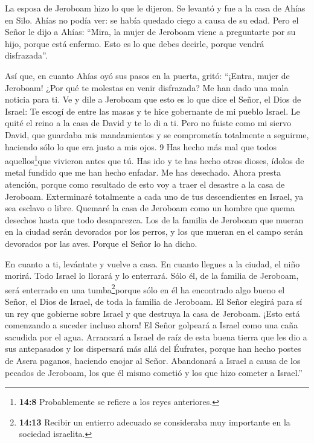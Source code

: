  La esposa de Jeroboam hizo lo que le dijeron. Se levantó y
fue a la casa de Ahías en Silo. Ahías no podía ver: se había quedado
ciego a causa de su edad.  Pero el Señor le dijo a Ahías:
``Mira, la mujer de Jeroboam viene a preguntarte por su hijo, porque
está enfermo. Esto es lo que debes decirle, porque vendrá disfrazada''.

 Así que, en cuanto Ahías oyó sus pasos en la puerta, gritó:
``¡Entra, mujer de Jeroboam! ¿Por qué te molestas en venir disfrazada?
Me han dado una mala noticia para ti.  Ve y dile a Jeroboam
que esto es lo que dice el Señor, el Dios de Israel: Te escogí de entre
las masas y te hice gobernante de mi pueblo Israel.  Le
quité el reino a la casa de David y te lo di a ti. Pero no fuiste como
mi siervo David, que guardaba mis mandamientos y se comprometía
totalmente a seguirme, haciendo sólo lo que era justo a mis ojos. 9 Has
hecho más mal que todos aquellos\footnote{\textbf{14:8} Probablemente se
  refiere a los reyes anteriores.}que vivieron antes que tú. Has ido y
te has hecho otros dioses, ídolos de metal fundido que me han hecho
enfadar. Me has desechado.  Ahora presta atención, porque
como resultado de esto voy a traer el desastre a la casa de Jeroboam.
Exterminaré totalmente a cada uno de tus descendientes en Israel, ya sea
esclavo o libre. Quemaré la casa de Jeroboam como un hombre que quema
desechos hasta que todo desaparezca.  Los de la familia de
Jeroboam que mueran en la ciudad serán devorados por los perros, y los
que mueran en el campo serán devorados por las aves. Porque el Señor lo
ha dicho.

 En cuanto a ti, levántate y vuelve a casa. En cuanto
llegues a la ciudad, el niño morirá.  Todo Israel lo
llorará y lo enterrará. Sólo él, de la familia de Jeroboam, será
enterrado en una tumba\footnote{\textbf{14:13} Recibir un entierro
  adecuado se consideraba muy importante en la sociedad israelita.}porque
sólo en él ha encontrado algo bueno el Señor, el Dios de Israel, de toda
la familia de Jeroboam.  El Señor elegirá para sí un rey
que gobierne sobre Israel y que destruya la casa de Jeroboam. ¡Esto está
comenzando a suceder incluso ahora!  El Señor golpeará a
Israel como una caña sacudida por el agua. Arrancará a Israel de raíz de
esta buena tierra que les dio a sus antepasados y los dispersará más
allá del Éufrates, porque han hecho postes de Asera paganos, haciendo
enojar al Señor.  Abandonará a Israel a causa de los
pecados de Jeroboam, los que él mismo cometió y los que hizo cometer a
Israel.''


